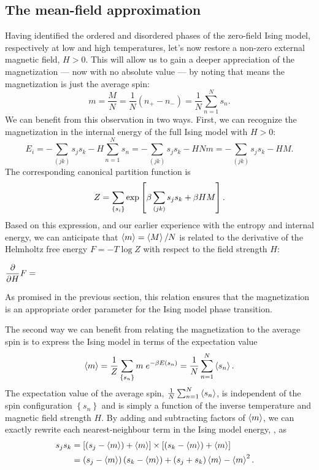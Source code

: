 \subsection{\label{sec:mean_field}The mean-field approximation}
Having identified the ordered and disordered phases of the zero-field Ising model, respectively at low and high temperatures, let's now restore a non-zero external magnetic field, $H > 0$.
This will allow us to gain a deeper appreciation of the magnetization --- now with no absolute value --- by noting that  means the magnetization is just the average spin:
\begin{equation*}
  m = \frac{M}{N} = \frac{1}{N}\left(n_+ - n_-\right) = \frac{1}{N} \sum_{n = 1}^N s_n.
\end{equation*}
We can benefit from this observation in two ways.
First, we can recognize the magnetization in the internal energy of the full Ising model with $H >0$:
\begin{equation*}
  E_i = -\sum_{(jk)} s_j s_k - H \sum_{n = 1}^N s_n = -\sum_{(jk)} s_j s_k - H N m = -\sum_{(jk)} s_j s_k - H M.
\end{equation*}
The corresponding canonical partition function is
\begin{equation*}
  Z = \sum_{\left\{s_i\right\}} \exp\left[\beta \sum_{(jk)} s_j s_k + \beta H M\right].
\end{equation*}
Based on this expression, and our earlier experience with the entropy and internal energy, we can anticipate that $\left\langle m \right\rangle = \left\langle M \right\rangle / N$ is related to the derivative of the Helmholtz free energy $F = -T\log Z$ with respect to the field strength $H$:
\begin{mdframed}
  $\displaystyle \frac{\partial }{\partial H} F = $ \\[100 pt]
\end{mdframed}
As promised in the previous section, this relation ensures that the magnetization is an appropriate order parameter for the Ising model phase transition.

The second way we can benefit from relating the magnetization to the average spin is to express the Ising model in terms of the expectation value
\begin{equation*}
  \left\langle m \right\rangle = \frac{1}{Z} \sum_{\left\{s_n\right\}} m \; e^{-\beta E(s_n)} = \frac{1}{N} \sum_{n = 1}^N \left\langle s_n \right\rangle.
\end{equation*}
The expectation value of the average spin, $\frac{1}{N} \sum_{n = 1}^N \left\langle s_n \right\rangle$, is independent of the spin configuration $\left\{s_n\right\}$ and is simply a function of the inverse temperature \be and magnetic field strength $H$.
By adding and subtracting factors of $\left\langle m \right\rangle$, we can exactly rewrite each nearest-neighbour term in the Ising model energy, , as
\begin{align}
  s_j s_k & = \left[\left(s_j - \left\langle m \right\rangle\right) + \left\langle m \right\rangle\right] \times \left[\left(s_k - \left\langle m \right\rangle\right) + \left\langle m \right\rangle\right] \cr
          & = \left(s_j - \left\langle m \right\rangle\right) \left(s_k - \left\langle m \right\rangle\right) + \left(s_j + s_k\right)\left\langle m \right\rangle - \left\langle m \right\rangle^2. \label{eq:MF_start}
\end{align}


